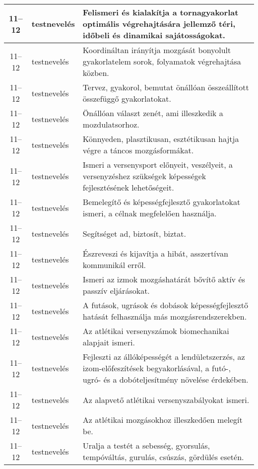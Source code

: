 \begin{small}
\begin{longtable}{c | p{2cm} |  p{11cm} }
              11--12 & testnevelés & Felismeri és kialakítja a tornagyakorlat optimális végrehajtására jellemző téri, időbeli és dinamikai sajátosságokat. \\ \hline
              11--12 & testnevelés & Koordináltan irányítja mozgását bonyolult gyakorlatelem sorok, folyamatok végrehajtása közben. \\ \hline
              11--12 & testnevelés & Tervez, gyakorol, bemutat önállóan összeállított összefüggő gyakorlatokat. \\ \hline
              11--12 & testnevelés & Önállóan választ zenét, ami illeszkedik a mozdulatsorhoz. \\ \hline
              11--12 & testnevelés & Könnyeden, plasztikusan, esztétikusan hajtja végre a táncos mozgásformákat. \\ \hline
              11--12 & testnevelés & Ismeri a versenysport előnyeit, veszélyeit, a versenyzéshez szükségek képességek fejlesztésének lehetőségeit. \\ \hline
              11--12 & testnevelés & Bemelegítő és képességfejlesztő gyakorlatokat ismeri, a célnak megfelelően használja. \\ \hline
              11--12 & testnevelés & Segítséget ad, biztosít, biztat. \\ \hline
              11--12 & testnevelés & Észreveszi és kijavítja a hibát, asszertívan kommunikál erről. \\ \hline
              11--12 & testnevelés & Ismeri az izmok mozgáshatárát bővítő aktív és passzív eljárásokat. \\ \hline
              11--12 & testnevelés & A futások, ugrások és dobások képességfejlesztő hatását felhasználja más mozgásrendszerekben. \\ \hline
              11--12 & testnevelés & Az atlétikai versenyszámok biomechanikai alapjait ismeri. \\ \hline
              11--12 & testnevelés & Fejleszti az állóképességét a lendületszerzés, az izom-előfeszítések begyakorlásával, a futó-, ugró- és a dobóteljesítmény növelése érdekében. \\ \hline
              11--12 & testnevelés & Az alapvető atlétikai versenyszabályokat ismeri. \\ \hline
              11--12 & testnevelés & Az atlétikai mozgásokhoz illeszkedően melegít be. \\ \hline
              11--12 & testnevelés & Uralja a testét a sebesség, gyorsulás, tempóváltás, gurulás, csúszás, gördülés esetén. \\ \hline

\end{longtable}
\end{small}

